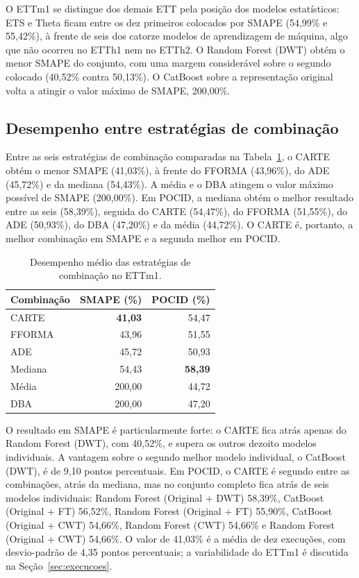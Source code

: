 O ETTm1 se distingue dos demais ETT pela posição dos modelos estatísticos: ETS e Theta ficam entre os dez primeiros colocados por SMAPE (54,99\% e 55,42\%), à frente de seis dos catorze modelos de aprendizagem de máquina, algo que não ocorreu no ETTh1 nem no ETTh2. O Random Forest (DWT) obtém o menor SMAPE do conjunto, com uma margem considerável sobre o segundo colocado (40,52\% contra 50,13\%). O CatBoost sobre a representação original volta a atingir o valor máximo de SMAPE, 200,00\%.

\subsection{Desempenho entre estratégias de combinação}

Entre as seis estratégias de combinação comparadas na Tabela~\ref{tab:ettm1-estaticas}, o CARTE obtém o menor SMAPE (41,03\%), à frente do FFORMA (43,96\%), do ADE (45,72\%) e da mediana (54,43\%). A média e o DBA atingem o valor máximo possível de SMAPE (200,00\%). Em POCID, a mediana obtém o melhor resultado entre as seis (58,39\%), seguida do CARTE (54,47\%), do FFORMA (51,55\%), do ADE (50,93\%), do DBA (47,20\%) e da média (44,72\%). O CARTE é, portanto, a melhor combinação em SMAPE e a segunda melhor em POCID.

\begin{table}[H]
\centering
\caption{Desempenho médio das estratégias de combinação no ETTm1.}
\label{tab:ettm1-estaticas}
\begin{tabular}{@{}lrr@{}}
\toprule
\textbf{Combinação} & \textbf{SMAPE (\%)} & \textbf{POCID (\%)} \\
\midrule
CARTE   & \textbf{41,03} & 54,47 \\
FFORMA  & 43,96 & 51,55 \\
ADE     & 45,72 & 50,93 \\
Mediana & 54,43 & \textbf{58,39} \\
Média   & 200,00 & 44,72 \\
DBA     & 200,00 & 47,20 \\
\bottomrule
\end{tabular}
\end{table}

O resultado em SMAPE é particularmente forte: o CARTE fica atrás apenas do Random Forest (DWT), com 40,52\%, e supera os outros dezoito modelos individuais. A vantagem sobre o segundo melhor modelo individual, o CatBoost (DWT), é de 9,10 pontos percentuais. Em POCID, o CARTE é segundo entre as combinações, atrás da mediana, mas no conjunto completo fica atrás de seis modelos individuais: Random Forest (Original + DWT) 58,39\%, CatBoost (Original + FT) 56,52\%, Random Forest (Original + FT) 55,90\%, CatBoost (Original + CWT) 54,66\%, Random Forest (CWT) 54,66\% e Random Forest (Original + CWT) 54,66\%. O valor de 41,03\% é a média de dez execuções, com desvio-padrão de 4,35 pontos percentuais; a variabilidade do ETTm1 é discutida na Seção~\ref{sec:execucoes}.

